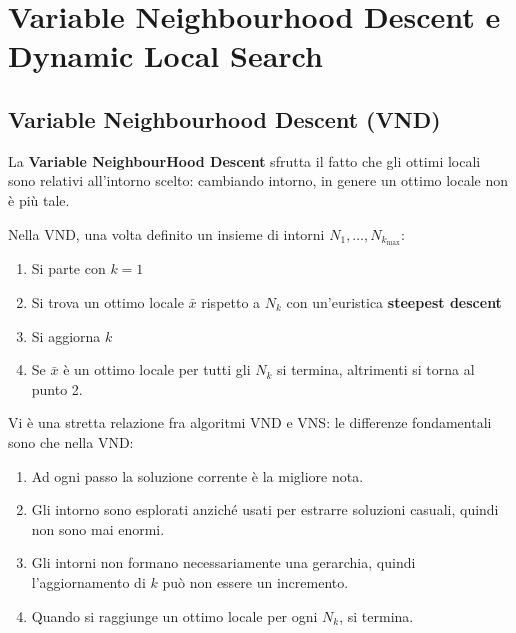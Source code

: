 \documentclass[\main/main.tex]{subfiles}
\begin{document}
\chapter{Variable Neighbourhood Descent e Dynamic Local Search}
\section{Variable Neighbourhood Descent (VND)}
\begin{multicols}{2}
\begin{observation}
    La \textbf{Variable NeighbourHood Descent} sfrutta il fatto che gli ottimi locali sono relativi all'intorno scelto: cambiando intorno, in genere un ottimo locale non è più tale.
\end{observation}
\begin{observation}
    Nella VND, una volta definito un insieme di intorni \(N_1, \ldots, N_{k_{\max}}\):
    \begin{enumerate}
        \item Si parte con \(k=1\)
        \item Si trova un ottimo locale \(\bar{x}\) rispetto a \(N_k\) con un'euristica \textbf{steepest descent}
        \item Si aggiorna \(k\)
        \item Se \(\bar{x}\) è un ottimo locale per tutti gli \(N_k\) si termina, altrimenti si torna al punto 2.
    \end{enumerate}
\end{observation}
\begin{observation}
    Vi è una stretta relazione fra algoritmi VND e VNS: le differenze fondamentali sono che nella VND:
    \begin{enumerate}
        \item Ad ogni passo la soluzione corrente è la migliore nota.
        \item Gli intorno sono esplorati anziché usati per estrarre soluzioni casuali, quindi non sono mai enormi.
        \item Gli intorni non formano necessariamente una gerarchia, quindi l'aggiornamento di \(k\) può non essere un incremento.
        \item Quando si raggiunge un ottimo locale per ogni \(N_k\), si termina.
    \end{enumerate}
\end{observation}
\begin{observation}

\end{observation}
\end{multicols}
\end{document}
